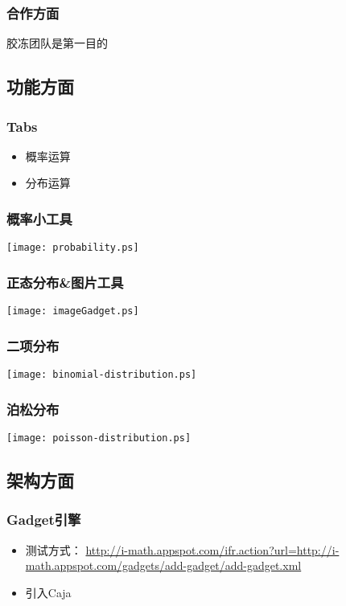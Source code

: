 \documentclass[dvipdfm,serif,mathserif]{beamer}
\begin{document}
\begin{frame}
  \frametitle{合作方面}
\begin{center}
 \item 胶冻团队是第一目的
\end{center}
\end{frame}

\subsection{功能方面}

\begin{frame}
  \frametitle{Tabs}
\begin{itemize}
 \item 概率运算
\item 分布运算
\end{itemize}
\end{frame}


\begin{frame}
  \frametitle{概率小工具}
  \texttt{[image: probability.ps]}
\end{frame}

\begin{frame}
  \frametitle{正态分布\&图片工具}
  \texttt{[image: imageGadget.ps]}
\end{frame}

\begin{frame}
  \frametitle{二项分布}
  \texttt{[image: binomial-distribution.ps]}
\end{frame}

\begin{frame}
  \frametitle{泊松分布}
  \texttt{[image: poisson-distribution.ps]}
\end{frame}


\subsection{架构方面}

\begin{frame}
  \frametitle{Gadget引擎}
\begin{itemize}
 \item 测试方式：
\href{http://i-math.appspot.com/ifr.action?url=http://i-math.appspot.com/gadgets/add-gadget/add-gadget.xml}{http://i-math.appspot.com/ifr.action?url=http://i-math.appspot.com/gadgets/add-gadget/add-gadget.xml}
\item 引入Caja
  \end{itemize}
\end{frame}
\end{document}
